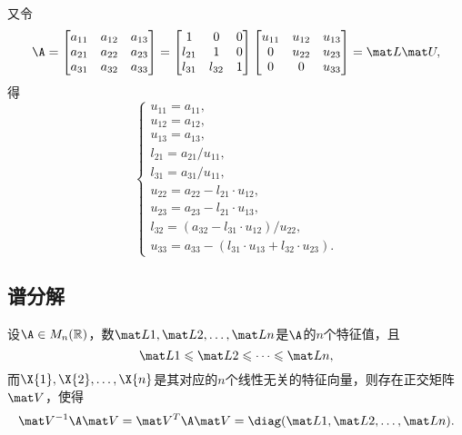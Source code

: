 又令\[
\A = \begin{bmatrix}
a_{11} & a_{12} & a_{13} \\
a_{21} & a_{22} & a_{23} \\
a_{31} & a_{32} & a_{33}
\end{bmatrix} = \begin{bmatrix}
1 & 0 & 0 \\
l_{21} & 1 & 0 \\
l_{31} & l_{32} & 1
\end{bmatrix} \begin{bmatrix}
u_{11} & u_{12} & u_{13} \\
0 & u_{22} & u_{23} \\
0 & 0 & u_{33}
\end{bmatrix} = \L \U,
\]得\[
\left\{\begin{array}{l}
u_{11} = a_{11}, \\
u_{12} = a_{12}, \\
u_{13} = a_{13}, \\
l_{21} = a_{21} / u_{11}, \\
l_{31} = a_{31} / u_{11}, \\
u_{22} = a_{22} - l_{21} \cdot u_{12}, \\
u_{23} = a_{23} - l_{21} \cdot u_{13}, \\
l_{32} = (a_{32} - l_{31} \cdot u_{12}) / u_{22}, \\
u_{33} = a_{33} - (l_{31} \cdot u_{13} + l_{32} \cdot u_{23}).
\end{array}\right.
\]
\endgroup%

\subsection{谱分解}
\begin{theorem}
设\(\A \in M_n(\mathbb{R})\)，数\(\L{1},\L{2},\dotsc,\L{n}\)是\(\A\)的\(n\)个特征值，且\[
\L{1}\leqslant\L{2}\leqslant\dotsb\leqslant\L{n},
\]而\(\X{1},\X{2},\dotsc,\X{n}\)是其对应的\(n\)个线性无关的特征向量，则存在正交矩阵\(\Q\)，使得\[
\Q^{-1}\A\Q = \Q^T\A\Q = \diag(\L{1},\L{2},\dotsc,\L{n}).
\]
\end{theorem}

